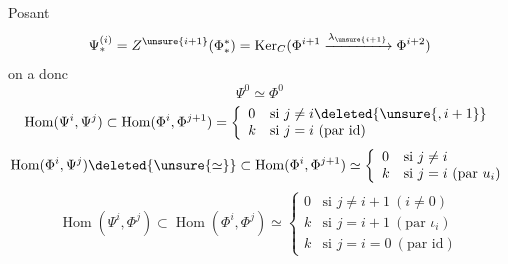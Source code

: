  Posant
\[
\Psi_*^{(i)}=Z^{\unsure{i+1}}(\Phi_*^*)
=\operatorname{Ker}_C(\Phi^{i+1}\xrightarrow{\lambda_{\unsure{i+1}}}\Phi^{i+2})
\]
on a donc 
\[
\Psi^0\simeq\Phi^0
\]
\[
\operatorname{Hom}(\Psi^i,\Psi^j)
\subset\operatorname{Hom}(\Phi^i,\Phi^{j+1})=
\left\{\begin{array}{ll}
0&\text{si }j\neq i\deleted{\unsure{,i+1}}\\
k&\text{si }j=i\ (\text{par id})
\end{array}\right.
\]
\[
\operatorname{Hom}(\Phi^i,\Psi^j)\deleted{\unsure{\simeq}}
\subset\operatorname{Hom}(\Phi^i,\Phi^{j+1})\simeq
\left\{\begin{array}{ll}0&\text{si }j\neq i\\
k&\text{si }j=i\ (\text{par }u_i)
\end{array}\right.
\]
\[
\operatorname{Hom}(\Psi^i,\Phi^j)
\subset\operatorname{Hom}(\Phi^i,\Phi^j)\simeq
\left\{\begin{array}{ll}
0&\text{si }j\neq i+1\ (i\neq0)\\
k&\text{si }j=i+1\ (\text{par }\iota_i)\\
k&\text{si }j=i=0\ (\text{par id})
\end{array}\right.
\]

